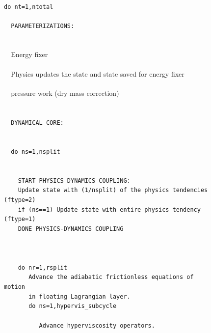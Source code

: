 \documentclass{agujournal}
\begin{document}
\begin{figure}[h]

\verb+do nt=1,ntotal+\\
\verb+  +\\
\verb+  PARAMETERIZATIONS:+\\
\verb+  +\\
\verb+  +{\color{blue}{output 'pBF'}}\\
\verb+  +Energy fixer\\
\verb+  +{\color{blue}{output 'pBP'}}\\
\verb+  +Physics updates the state and state saved for energy fixer\\
\verb+  +{\color{blue}{output 'pAP'}}\\
\verb+  +pressure work (dry mass correction)\\
\verb+  +{\color{blue}{output 'pAM'}}\\
\verb+  +\\
\verb+  DYNAMICAL CORE:+\\
\verb+  +\\
\verb+  +{\color{blue}{output 'dED'}}\\
\verb+  do ns=1,nsplit+\\
\verb+    +{\color{blue}{output 'dAF'}}\\
\verb+  +\\
\verb+    START PHYSICS-DYNAMICS COUPLING:+\\
\verb+    Update state with (1/nsplit) of the physics tendencies (ftype=2)+\\
\verb+    if (ns==1) Update state with entire physics tendency (ftype=1)+\\
\verb+    DONE PHYSICS-DYNAMICS COUPLING+\\
\verb+  +\\
\verb+    +{\color{blue}{output 'dBD'}}\\
\verb+  +\\
\verb+    do nr=1,rsplit+\\
\verb+       Advance the adiabatic frictionless equations of motion +\\
\verb+       in floating Lagrangian layer.+\\
\verb+       do ns=1,hypervis_subcycle+\\
\verb+          +{\color{blue}{output 'dBH'}}\\
\verb+          Advance hyperviscosity operators.+\\
\verb+          +{\color{blue}{output 'dCH'}}\\

\end{figure}
\end{document}
